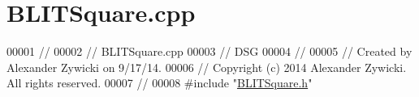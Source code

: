 \hypertarget{_b_l_i_t_square_8cpp_source}{\section{B\+L\+I\+T\+Square.\+cpp}
\label{_b_l_i_t_square_8cpp_source}
}

\begin{DoxyCode}
00001 \textcolor{comment}{//}
00002 \textcolor{comment}{//  BLITSquare.cpp}
00003 \textcolor{comment}{//  DSG}
00004 \textcolor{comment}{//}
00005 \textcolor{comment}{//  Created by Alexander Zywicki on 9/17/14.}
00006 \textcolor{comment}{//  Copyright (c) 2014 Alexander Zywicki. All rights reserved.}
00007 \textcolor{comment}{//}
00008 \textcolor{preprocessor}{#include "\hyperlink{_b_l_i_t_square_8h}{BLITSquare.h}"}
\end{DoxyCode}

